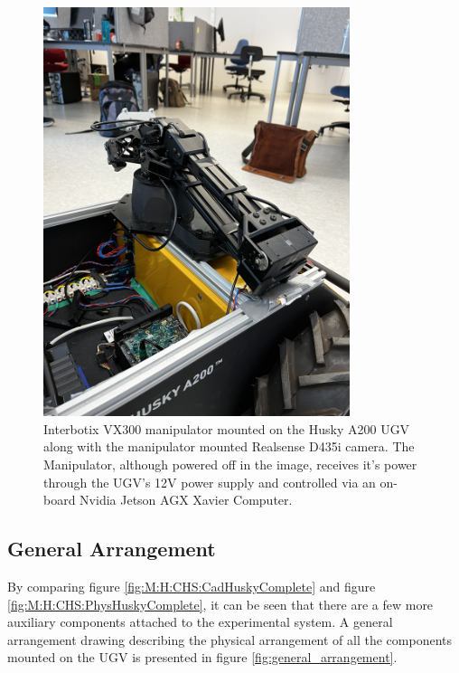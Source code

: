 \begin{figure}[H]
\begin{minipage}[b]{0.49\textwidth}
    \includegraphics[angle=-90,width = 0.8\textwidth]{Figures/figVX300PhysComplete5.jpg}
  \end{minipage}
  \caption{Interbotix VX300 manipulator mounted on the Husky A200 UGV along with the manipulator mounted Realsense D435i camera. The Manipulator, although powered off in the image, receives it's power through the UGV's 12V power supply and controlled via an on-board Nvidia Jetson AGX Xavier Computer.}
  \label{fig:M:H:M:M:MMC:Vx300Complete}
\end{figure}

\subsection{General Arrangement}\label{M:H:GeneralArrangement}
By comparing figure \ref{fig:M:H:CHS:CadHuskyComplete} and figure \ref{fig:M:H:CHS:PhysHuskyComplete}, it can be seen that there are a few more auxiliary components attached to the experimental system. A general arrangement drawing describing the physical arrangement of all the components mounted on the UGV is presented in figure \ref{fig:general_arrangement}.

